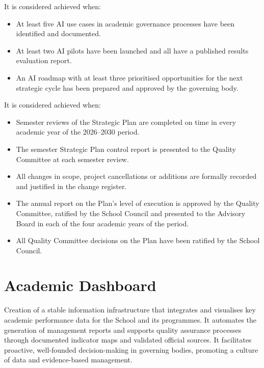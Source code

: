 \documentclass[11pt,a4paper]{scrreprt}
\begin{document}
\vspace{6pt}

\begin{tcolorbox}[pabox={gobcolor}{Objective 4. Improved decision-making through artificial intelligence applied to academic governance}]
\small It is considered achieved when:
\begin{itemize}[noitemsep,topsep=2pt]
\item At least five AI use cases in academic governance processes have been identified and documented.
\item At least two AI pilots have been launched and all have a published results evaluation report.
\item An AI roadmap with at least three prioritised opportunities for the next strategic cycle has been prepared and approved by the governing body.
\end{itemize}
\end{tcolorbox}

\vspace{6pt}

\begin{tcolorbox}[pabox={gobcolor}{Objective 5. Adaptive monitoring of the Strategic Plan}]
\small It is considered achieved when:
\begin{itemize}[noitemsep,topsep=2pt]
\item Semester reviews of the Strategic Plan are completed on time in every academic year of the 2026--2030 period.
\item The semester Strategic Plan control report is presented to the Quality Committee at each semester review.
\item All changes in scope, project cancellations or additions are formally recorded and justified in the change register.
\item The annual report on the Plan's level of execution is approved by the Quality Committee, ratified by the School Council and presented to the Advisory Board in each of the four academic years of the period.
\item All Quality Committee decisions on the Plan have been ratified by the School Council.
\end{itemize}
\end{tcolorbox}

\clearpage

\chapter[Academic Dashboard]{\textcolor{dashcolor}{Academic Dashboard}}
\begin{tcolorbox}[descbox]
\small Creation of a stable information infrastructure that integrates and visualises key academic performance data for the School and its programmes. It automates the generation of management reports and supports quality assurance processes through documented indicator maps and validated official sources. It facilitates proactive, well-founded decision-making in governing bodies, promoting a culture of data and evidence-based management.
\end{tcolorbox}
\end{document}
